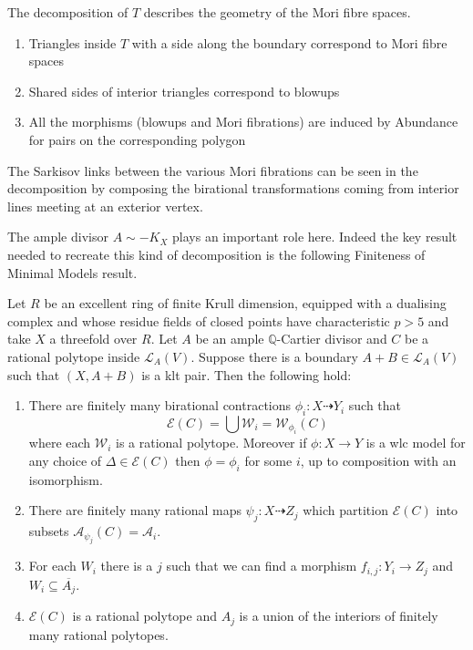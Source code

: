 \documentclass[a4paper,12pt]{book}
\begin{document}
	The decomposition of $T$ describes the geometry of the Mori fibre spaces.
	\begin{enumerate}
		\item Triangles inside $T$ with a side along the boundary correspond to Mori fibre spaces
		\item Shared sides of interior triangles correspond to blowups
		\item All the morphisms (blowups and Mori fibrations) are induced by Abundance for pairs on the corresponding polygon
	\end{enumerate}
	The Sarkisov links between the various Mori fibrations can be seen in the decomposition by composing the birational transformations coming from interior lines meeting at an exterior vertex.

	The ample divisor $A\sim -K_{X}$ plays an important role here. Indeed the key result needed to recreate this kind of decomposition is the following Finiteness of Minimal Models result.
	
	\begin{theo}
		Let $R$ be an excellent ring of finite Krull dimension, equipped with a dualising complex and whose residue fields of closed points have characteristic $p>5$ and take $X$ a threefold over $R$. Let $A$ be an ample $\mathbb{Q}$-Cartier divisor and $C$ be a rational polytope inside $\mathcal{L}_{A}(V)$. Suppose there is a boundary $A+B \in \mathcal{L}_{A}(V)$ such that $(X,A+B)$ is a klt pair. Then the following hold:
		
		\begin{enumerate}
			\item There are finitely many birational contractions $\phi_{i}:X \dashrightarrow Y_{i}$ such that 
			\[\mathcal{E}(C) = \bigcup \mathcal{W}_{i}=\mathcal{W}_{\phi_{i}}(C)\]
			where each $\mathcal{W}_{i}$ is a rational polytope. Moreover if $\phi:X \to Y$ is a wlc model for any choice of $\Delta \in \mathcal{E}(C)$ then $\phi=\phi_{i}$ for some $i$, up to composition with an isomorphism.
			
			\item There are finitely many rational maps $\psi_{j}:X \dashrightarrow Z_{j}$ which partition $\mathcal{E}(C)$ into subsets $\mathcal{A}_{\psi_{j}}(C)=\mathcal{A}_{i}$.
			\item  For each $W_{i}$ there is a $j$ such that we can find a morphism $f_{i,j}: Y_{i} \to Z_{j}$ and $W_{i} \subseteq \overline{A_{j}}$.
			\item  $\mathcal{E}(C)$ is a rational polytope and $A_{j}$ is a union of the interiors of finitely many rational polytopes.
		\end{enumerate}
	\end{theo}
	
\end{document}
